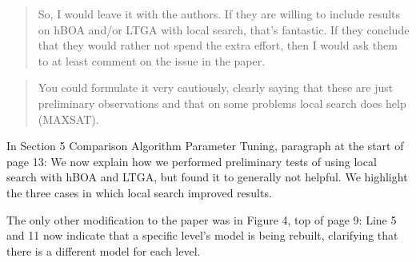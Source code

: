 \documentclass[]{article}
\begin{document}
\begin{quote}
So, I would leave it with the authors. If they are willing to include results on hBOA and/or LTGA with local search, that’s fantastic.
If they conclude that they would rather not spend the extra effort, then I would ask them to at least comment on the issue in the paper.
\end{quote}

\begin{quote}
You could formulate it very cautiously, clearly saying that these are just preliminary observations and that on some problems local search does help (MAXSAT).
\end{quote}

In Section 5 Comparison Algorithm Parameter Tuning, paragraph at the start of page 13: We now explain how
we performed preliminary tests of using local search with hBOA and LTGA, but found it to generally not helpful. We
highlight the three cases in which local search improved results.

The only other modification to the paper was in Figure 4, top of page 9: Line 5 and 11 now indicate that a specific
level's model is being rebuilt, clarifying that there is a different model for each level.
\end{document}
